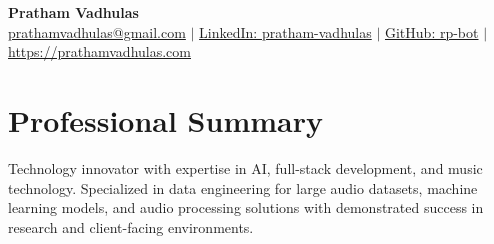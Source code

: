 \documentclass[letterpaper,11pt]{article}
\begin{document}

\hypersetup{urlcolor = black} %

\begin{center}
    \textbf{\LARGE Pratham Vadhulas} \\ \vspace{3pt}
    \small
     \hspace{.5pt} {\underline{prathamvadhulas@gmail.com}}
    $|$
     \hspace{.5pt} {\underline{LinkedIn: pratham-vadhulas}}
    $|$
     \hspace{.5pt} {\underline{GitHub: rp-bot}}
    $|$
 \hspace{.5pt} {\underline{https://prathamvadhulas.com}}
\end{center}
\vspace{-18pt}

\hypersetup{urlcolor = linkcolor} %

\section{Professional Summary}
Technology innovator with expertise in AI, full-stack development, and music technology. Specialized in data engineering for large audio datasets, machine learning models, and audio processing solutions with demonstrated success in research and client-facing environments.
\end{document}
